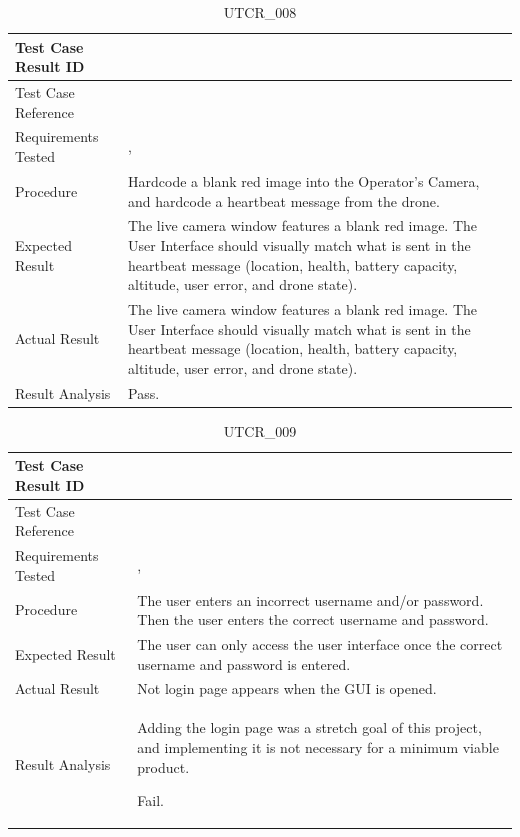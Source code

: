 \documentclass[12pt, titlepage]{article}
\begin{document}
\begin{table}[!h]
\begin{center}
\caption {UTCR\_008}
\label{tab:UTCR_008}
\begin{tabular}{ | m{3.2cm} | m{12.2cm} | } 
\hline
Test Case Result ID & \nameref{tab:UTCR_008} \\ 
\hline
Test Case Reference & \nameref{tab:UTC_008}  \\ 
\hline
Requirements Tested & \nameref{USE_005}, \nameref{SR_002} \\ 
\hline
Procedure & Hardcode a blank red image into the Operator's Camera, and hardcode a heartbeat message from the drone. \\ 
\hline
Expected Result & The live camera window features a blank red image. The User Interface should visually match what is sent in the heartbeat message (location, health, battery capacity, altitude, user error, and drone state). \\ 
\hline
Actual Result & The live camera window features a blank red image. The User Interface should visually match what is sent in the heartbeat message (location, health, battery capacity, altitude, user error, and drone state). \\ 
\hline
Result Analysis & Pass. \\ 
\hline
\end{tabular}
\end{center}
\end{table}

\begin{table}[!h]
\begin{center}
\caption {UTCR\_009}
\label{tab:UTCR_009}
\begin{tabular}{ | m{3.2cm} | m{12.2cm} | } 
\hline
Test Case Result ID & \nameref{tab:UTCR_009} \\ 
\hline
Test Case Reference & \nameref{tab:UTC_009}  \\ 
\hline
Requirements Tested & \nameref{SR_013}, \nameref{SEC_001} \\ 
\hline
Procedure & The user enters an incorrect username and/or password. Then the user enters the correct username and password. \\ 
\hline
Expected Result & The user can only access the user interface once the correct username and password is entered. \\ 
\hline
Actual Result & Not login page appears when the GUI is opened.  \\ 
\hline
Result Analysis & Adding the login page was a stretch goal of this project, and implementing it is not necessary for a minimum viable product. 

Fail. \\ 
\hline
\end{tabular}
\end{center}
\end{table}
\end{document}
